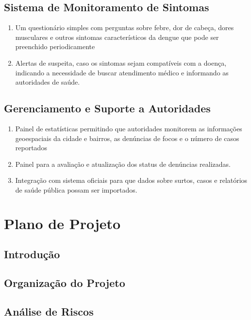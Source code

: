 \documentclass[a4paper, 12pt]{article}
\begin{document}
\subsection{Sistema de Monitoramento de Sintomas}
\begin{enumerate}
    \item Um questionário simples com perguntas sobre febre, dor de cabeça, dores musculares e outros sintomas característicos da dengue que pode ser preenchido periodicamente
    \item Alertas de suspeita, caso os sintomas sejam compatíveis com a doença, indicando a necessidade de buscar atendimento médico e informando as autoridades de saúde.
\end{enumerate}
\subsection{Gerenciamento e Suporte a Autoridades}
\begin{enumerate}
    \item Painel de estatísticas permitindo que autoridades monitorem as informações geoespaciais da cidade e bairros, as denúncias de focos e o número de casos  reportados
    \item Painel para a avaliação e atualização dos status de denúncias realizadas.
    \item Integração com sistema oficiais para que dados sobre surtos, casos e relatórios de saúde pública possam ser importados.
\end{enumerate}

\newpage
\section{Plano de Projeto}

\subsection{Introdução}

\subsection{Organização do Projeto}

\subsection{Análise de Riscos}
\end{document}
